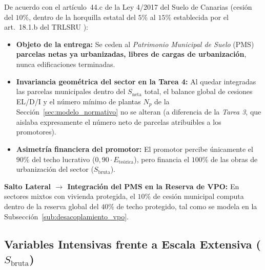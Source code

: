 De acuerdo con el artículo~44.c de la Ley 4/2017 del Suelo de Canarias \cite{ley4_2017_canarias} (cesión del $10\%$, dentro de la horquilla estatal del $5\%$ al $15\%$ establecida por el art.~18.1.b del TRLSRU \cite{trlsru2015}):

\begin{itemize}
  \item \textbf{Objeto de la entrega:} Se ceden al \emph{Patrimonio Municipal de Suelo} (PMS) \textbf{parcelas netas ya urbanizadas, libres de cargas de urbanización}, nunca edificaciones terminadas.
  \item \textbf{Invariancia geométrica del sector en la Tarea 4:} Al quedar integradas las parcelas municipales dentro del $S_{\text{neta}}$ total, el balance global de cesiones EL/D/I y el número mínimo de plantas $N_p$ de la Sección~\ref{sec:modelo_normativo} no se alteran (a diferencia de la \emph{Tarea 3}, que aislaba expresamente el número neto de parcelas atribuibles a los promotores).
  \item \textbf{Asimetría financiera del promotor:} El promotor percibe únicamente el $90\%$ del techo lucrativo ($0,90 \cdot E_{\text{teórica}}$), pero financia el $100\%$ de las obras de urbanización del sector ($S_{\text{bruta}}$).
\end{itemize}

\begin{tcolorbox}[jumpbox]
\textbf{Salto Lateral $\to$ Integración del PMS en la Reserva de VPO:} En sectores mixtos con vivienda protegida, el $10\%$ de cesión municipal computa dentro de la reserva global del $40\%$ de techo protegido, tal como se modela en la Subsección~\ref{sub:desacoplamiento_vpo}.
\end{tcolorbox}

\subsection{Variables Intensivas frente a Escala Extensiva ($S_{\text{bruta}}$)}
\label{sub:escala_extensiva}

